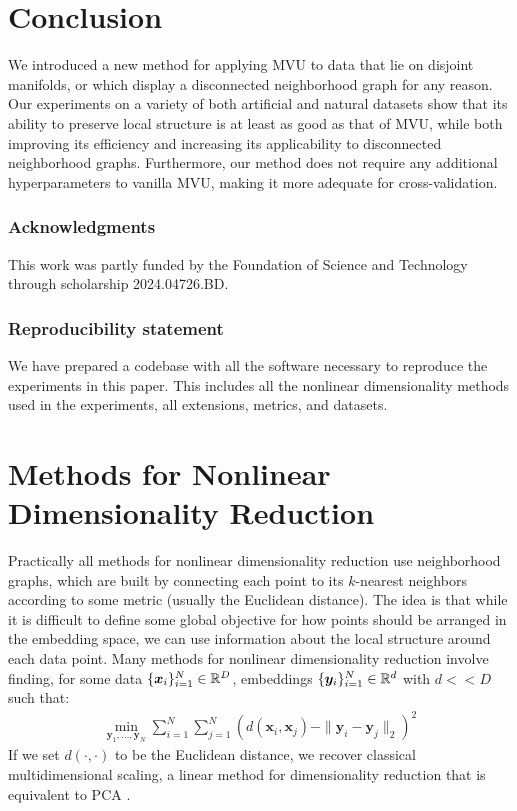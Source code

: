 \documentclass{article} %
\begin{document}
\section{Conclusion} \label{sec:conclusion}

We introduced a new method for applying MVU to data that lie on disjoint manifolds, or which display a disconnected neighborhood graph for any reason. Our experiments on a variety of both artificial and natural datasets show that its ability to preserve local structure is at least as good as that of MVU, while both improving its efficiency and increasing its applicability to disconnected neighborhood graphs. Furthermore, our method does not require any additional hyperparameters to vanilla MVU, making it more adequate for cross-validation.

\subsubsection*{Acknowledgments}
This work was partly funded by the Foundation of Science and Technology through scholarship 2024.04726.BD.

\subsubsection*{Reproducibility statement}

We have prepared a codebase with all the software necessary to reproduce the experiments in this paper. This includes all the nonlinear dimensionality methods used in the experiments, all extensions, metrics, and datasets.

\newpage

\newpage

\newpage




\newpage

\appendix

\section{Methods for Nonlinear Dimensionality Reduction}\label{app:nldr}

Practically all methods for nonlinear dimensionality reduction use neighborhood graphs, which are built by connecting each point to its $k$-nearest neighbors according to some metric (usually the Euclidean distance). The idea is that while it is difficult to define some global objective for how points should be arranged in the embedding space, we can use information about the local structure around each data point. Many methods for nonlinear dimensionality reduction involve finding, for some data $\{\bm{x}_i\}_{i=1}^N\in\mathbb{R}^D$, embeddings $\{\bm{y}_i\}_{i=1}^N\in\mathbb{R}^d$ with $d<<D$ such that:
\begin{align}
\min_{\bm{y}_1,\ldots,\bm{y}_{N}} \sum_{i=1}^{N}\sum_{j=1}^{N} (d(\bm{x}_i, \bm{x}_j) - \|\bm{y}_i - \bm{y}_j\|_2)^2
\end{align}
If we set $d(\cdot,\cdot)$ to be the Euclidean distance, we recover classical multidimensional scaling, a linear method for dimensionality reduction that is equivalent to PCA \cite{mds}.
\end{document}
